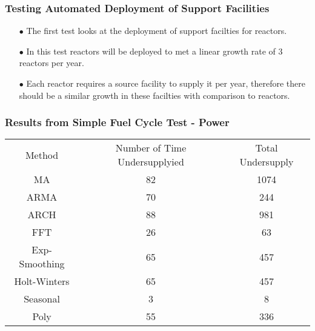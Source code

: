 \begin{frame}
  \frametitle{Testing Automated Deployment of Support Facilities}
  \begin{itemize}
      \item[$\bullet$] The first test looks at the deployment of support
                       facilties for reactors. 
      \item[$\bullet$] In this test reactors will be deployed to met a linear
                       growth rate of 3 reactors per year. 
      \item[$\bullet$] Each reactor requires a source facility to supply it
                       per year, therefore there should be a similar growth
                       in these facilties with comparison to reactors. 
   \end{itemize}        
\end{frame}

\begin{frame}
  \frametitle{Results from Simple Fuel Cycle Test - Power}
        \begin{tabular}{c c c}
        Method & Number of Time Undersupplyied & Total Undersupply \\
        MA & 82 & 1074 \\
        ARMA& 70 & 244 \\
        ARCH & 88 & 981 \\
        FFT & 26 & 63 \\
        Exp-Smoothing & 65 & 457 \\
        Holt-Winters & 65 & 457 \\
        Seasonal & 3 & 8 \\
        Poly & 55 & 336
        \end{tabular}
\end{frame}
